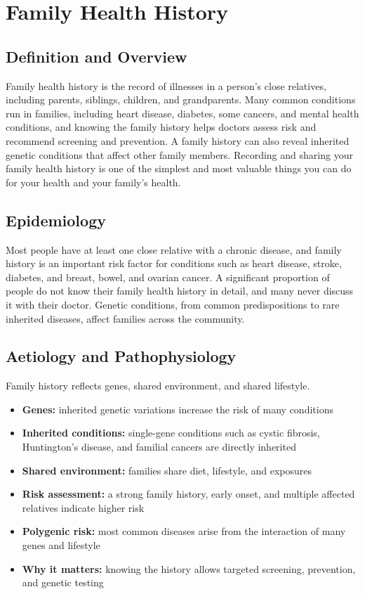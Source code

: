 \chapter{Family Health History}

\section*{Definition and Overview}
Family health history is the record of illnesses in a person's close relatives, including parents, siblings, children, and grandparents. Many common conditions run in families, including heart disease, diabetes, some cancers, and mental health conditions, and knowing the family history helps doctors assess risk and recommend screening and prevention. A family history can also reveal inherited genetic conditions that affect other family members. Recording and sharing your family health history is one of the simplest and most valuable things you can do for your health and your family's health.

\section*{Epidemiology}
Most people have at least one close relative with a chronic disease, and family history is an important risk factor for conditions such as heart disease, stroke, diabetes, and breast, bowel, and ovarian cancer. A significant proportion of people do not know their family health history in detail, and many never discuss it with their doctor. Genetic conditions, from common predispositions to rare inherited diseases, affect families across the community.

\section*{Aetiology and Pathophysiology}
Family history reflects genes, shared environment, and shared lifestyle.
\begin{itemize}
    \item \textbf{Genes:} inherited genetic variations increase the risk of many conditions
    \item \textbf{Inherited conditions:} single-gene conditions such as cystic fibrosis, Huntington's disease, and familial cancers are directly inherited
    \item \textbf{Shared environment:} families share diet, lifestyle, and exposures
    \item \textbf{Risk assessment:} a strong family history, early onset, and multiple affected relatives indicate higher risk
    \item \textbf{Polygenic risk:} most common diseases arise from the interaction of many genes and lifestyle
    \item \textbf{Why it matters:} knowing the history allows targeted screening, prevention, and genetic testing
\end{itemize}

